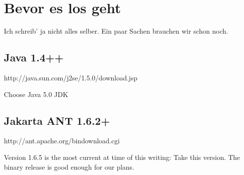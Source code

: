 \section{Bevor es los geht}
Ich schreib' ja nicht alles selber. Ein paar Sachen brauchen
wir schon noch.

\subsection{Java 1.4++}
http://java.sun.com/j2se/1.5.0/download.jsp
     
Choose Java 5.0 JDK

\subsection{Jakarta ANT 1.6.2+}
http://ant.apache.org/bindownload.cgi

Version 1.6.5 is the most current at time of this writing: Take
this version. The binary release is good enough for our plans.